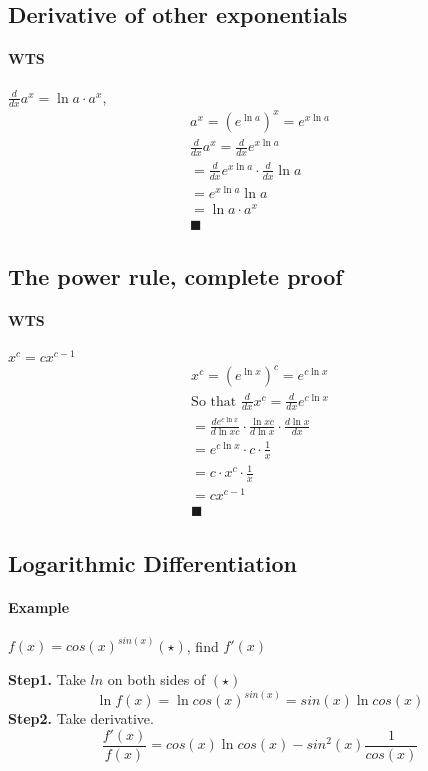 \documentclass{article}
\begin{document}
	\subsection{Derivative of other exponentials}
	\paragraph{WTS} $\frac{d}{dx}a^x = \ln{a} \cdot a^x$,
	\begin{align*}
		a^x = (e^{\ln{a}})^x = e^{x\ln{a}} \\
		\frac{d}{dx}a^x = \frac{d}{dx} e^{x\ln{a}} \\
		= \frac{d}{dx} e^{x\ln{a}} \cdot \frac{d}{dx} \ln{a} \\
		= e^{x\ln{a}} \ln{a} \\
		= \ln{a} \cdot a^x \\
		\blacksquare
	\end{align*}
	\subsection{The power rule, complete proof}
	\paragraph{WTS} $x^c = c x^{c-1}$ \\
	\begin{align*}
		x^c = (e^{\ln{x}})^c = e^{c\ln{x}} \\
		\text{So that }\frac{d}{dx}x^c = \frac{d}{dx}e^{c\ln{x}} \\
		= \frac{de^{c\ln{x}}}{d\ln{x}c} \cdot \frac{\ln{x}c}{d\ln{x}} \cdot \frac{d\ln{x}}{dx}\\
		= e^{c\ln{x}} \cdot c \cdot \frac{1}{x} \\
		= c \cdot x^c \cdot \frac{1}{x} \\
		= c x^{c-1} \\
		\blacksquare
	\end{align*}
	\subsection{Logarithmic Differentiation}
	\paragraph{Example} $f(x) = cos(x)^{sin(x)} (\star)$, find $f'(x)$
	
	\textbf{Step1.} Take $ln$ on both sides of $(\star)$
	\[ \ln{f(x)} = \ln{cos(x)^{sin(x)}} = sin(x) \ln{cos(x)}
	\]
	\textbf{Step2.} Take derivative.
	\[
	\frac{f'(x)}{f(x)} = cos(x) \ln{cos(x)} - sin^2(x)\frac{1}{cos(x)}
	\]
	
\end{document}
